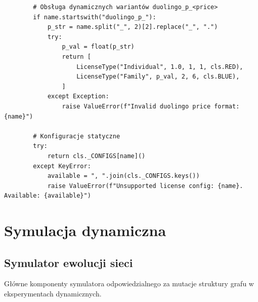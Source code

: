 {\begin{verbatim}
        # Obsługa dynamicznych wariantów duolingo_p_<price>
        if name.startswith("duolingo_p_"):
            p_str = name.split("_", 2)[2].replace("_", ".")
            try:
                p_val = float(p_str)
                return [
                    LicenseType("Individual", 1.0, 1, 1, cls.RED),
                    LicenseType("Family", p_val, 2, 6, cls.BLUE),
                ]
            except Exception:
                raise ValueError(f"Invalid duolingo price format: {name}")

        # Konfiguracje statyczne
        try:
            return cls._CONFIGS[name]()
        except KeyError:
            available = ", ".join(cls._CONFIGS.keys())
            raise ValueError(f"Unsupported license config: {name}. Available: {available}")
\end{verbatim}
    }

\section{Symulacja dynamiczna}
\subsection{Symulator ewolucji sieci}
Główne komponenty symulatora odpowiedzialnego za mutacje
struktury grafu w eksperymentach dynamicznych.

